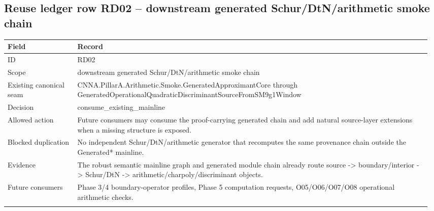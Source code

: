 \subsection*{Reuse ledger row RD02 -- downstream generated Schur/\allowbreak{}DtN/\allowbreak{}arithmetic smoke chain}
\begin{longtable}{L{0.16\linewidth} L{0.81\linewidth}}
\hline
\textbf{Field} & \textbf{Record}\\
\hline
ID & RD02\\
\hline\addlinespace[0.20em]
Scope & downstream generated Schur/\allowbreak{}DtN/\allowbreak{}arithmetic smoke chain\\
\hline\addlinespace[0.20em]
Existing canonical seam & CNNA.PillarA.Arithmetic.Smoke.GeneratedApproximantCore through GeneratedOperationalQuadraticDiscriminantSourceFromSM9g1Window\\
\hline\addlinespace[0.20em]
Decision & consume\_existing\_mainline\\
\hline\addlinespace[0.20em]
Allowed action & Future consumers may consume the proof-carrying generated chain and add natural source-layer extensions when a missing structure is exposed.\\
\hline\addlinespace[0.20em]
Blocked duplication & No independent Schur/\allowbreak{}DtN/\allowbreak{}arithmetic generator that recomputes the same provenance chain outside the Generated* mainline.\\
\hline\addlinespace[0.20em]
Evidence & The robust semantic mainline graph and generated module chain already route source -> boundary/\allowbreak{}interior -> Schur/\allowbreak{}DtN -> arithmetic/\allowbreak{}charpoly/\allowbreak{}discriminant objects.\\
\hline\addlinespace[0.20em]
Future consumers & Phase 3/\allowbreak{}4 boundary-operator profiles, Phase 5 computation requests, O05/\allowbreak{}O06/\allowbreak{}O07/\allowbreak{}O08 operational arithmetic checks.\\
\hline\addlinespace[0.20em]
\end{longtable}
